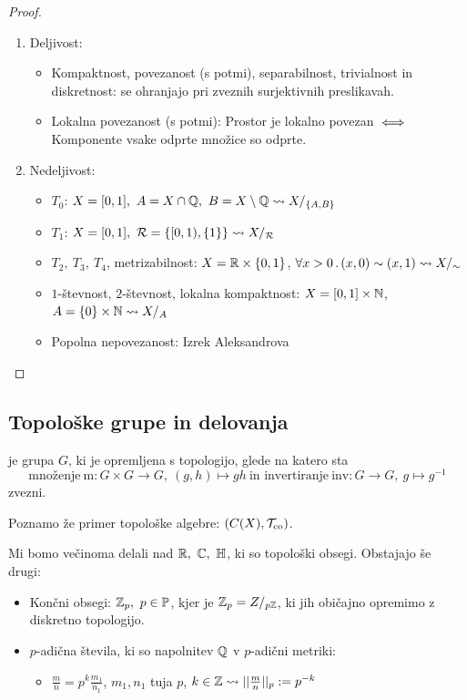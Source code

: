 \begin{proof} \
    \begin{enumerate}
        \item Deljivost:
        \begin{itemize}
            \item Kompaktnost, povezanost (s potmi), separabilnost, trivialnost in diskretnost: se ohranjajo pri zveznih surjektivnih preslikavah.
            \item Lokalna povezanost (s potmi): Prostor je lokalno povezan \(\iff\) Komponente vsake odprte množice so odprte. 
        \end{itemize}
        \item Nedeljivost:
        \begin{itemize}
            \item \(T_0\): \(X=[0,1], \ A = X \cap \mathbb{Q}, \ B = X \setminus \mathbb{Q} \leadsto X/_{\left\{A, B\right\}}\)
            \item \(T_1\): \(X=[0,1], \ \mathcal{R} = \left\{[0,1), \left\{1\right\}\right\} \leadsto X/_\mathcal{R}\)
            \item \(T_2, \ T_3, \ T_4\), metrizabilnost: \(X = \mathbb{R} \times \left\{0,1\right\}\), \(\forall x > 0 \,.\,(x, 0) \sim (x, 1) \leadsto X/_\sim\)
            \item \(1\)-števnost, \(2\)-števnost, lokalna kompaktnost: \(X=[0,1] \times \mathbb{N}\), \(A = \left\{0\right\} \times \mathbb{N} \leadsto X/_A\)
            \item Popolna nepovezanost: Izrek Aleksandrova \qedhere
        \end{itemize}
    \end{enumerate}    
\end{proof}

\subsection{Topološke grupe in delovanja}
\begin{definicija}
     je grupa \(G\), ki je opremljena s topologijo, glede na katero sta \[\text{množenje} \ \text{m}: G \times G \to G, \ (g, h) \mapsto gh \  \text{in invertiranje} \ \text{inv}: G \to G, \ g \mapsto g^{-1}\] zvezni.
\end{definicija}

\begin{opomba}
    Poznamo že primer topološke algebre: \((C(X), \mathcal{T}_{\text{co}})\).
\end{opomba}

Mi bomo večinoma delali nad \(\R, \ \C, \ \HH\), ki so topološki obsegi. Obstajajo še drugi:
\begin{itemize}
    \item Končni obsegi: \(\mathbb{Z}_p, \ p \in \mathbb{P}\), kjer je \(\mathbb{Z}_p = Z/_{p\mathbb{Z}}\), ki jih običajno opremimo z diskretno topologijo.
    \item \(p\)-adična števila, ki so napolnitev \(\mathbb{Q}\) v \(p\)-adični metriki:
    \begin{itemize}
        \item \(\frac{m}{n} = p^k \frac{m_1}{n_1}\), \(m_1, n_1\) tuja \(p\), \(k \in \mathbb{Z} \leadsto ||\frac{m}{n}||_p := p^{-k}\)
    \end{itemize}
\end{itemize}

